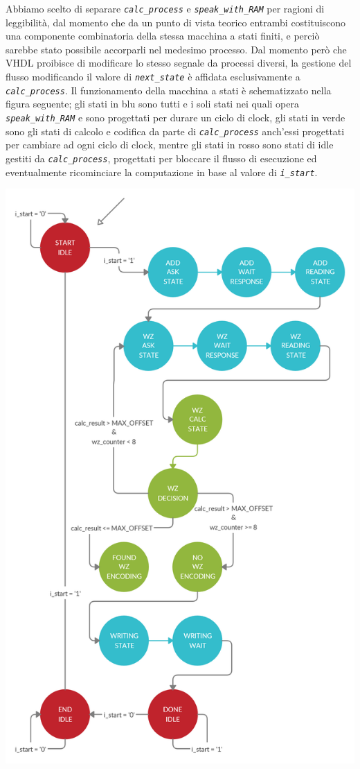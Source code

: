 \documentclass[12pt,a4paper,titlepage]{article}
\begin{document}
		Abbiamo scelto di separare \textit{\texttt{calc\_process}} e \textit{\texttt{speak\_with\_RAM}} per ragioni di leggibilità, dal momento che da un punto di vista teorico entrambi costituiscono una componente combinatoria della stessa macchina a stati finiti, e perciò sarebbe stato possibile accorparli nel medesimo processo. Dal momento però che VHDL proibisce di modificare lo stesso segnale da processi diversi, la gestione del flusso modificando il valore di \textit{\texttt{next\_state}} è affidata esclusivamente a \textit{\texttt{calc\_process}}.
		\newline
		\newline
		Il funzionamento della macchina a stati è schematizzato nella figura seguente; gli stati in blu sono tutti e i soli stati nei quali opera \textit{\texttt{speak\_with\_RAM}} e sono progettati per durare un ciclo di clock, gli stati in verde sono gli stati di calcolo e codifica da parte di \textit{\texttt{calc\_process}} anch'essi progettati per cambiare ad ogni ciclo di clock, mentre gli stati in rosso sono stati di idle gestiti da \textit{\texttt{calc\_process}}, progettati per bloccare il flusso di esecuzione ed eventualmente ricominciare la computazione in base al valore di \textit{\texttt{i\_start}}.

		\includegraphics[scale=0.275]{retlog_FSM_v1_2.png}
\end{document}
